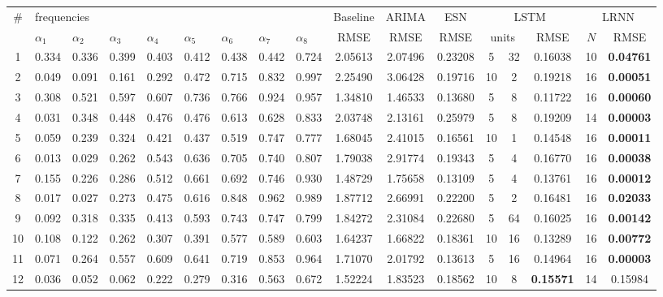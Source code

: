 \documentclass[preprint,12pt,times,authoryear]{elsarticle}%
\theoremstyle{definition}
\begin{document}
	
\begin{table}
  \centering\footnotesize
  \begin{tabular}{c*{8}{p{8mm}}cccc@{\,+\,}cccc}
     \toprule
	\# & \multicolumn{8}{l}{frequencies} & Baseline & ARIMA & ESN & \multicolumn{3}{c}{LSTM} & \multicolumn{2}{c}{LRNN}\\
	& $\alpha_1$ & $\alpha_2$ & $\alpha_3$ & $\alpha_4$ & $\alpha_5$ & $\alpha_6$ & $\alpha_7$ & $\alpha_8$ & RMSE & RMSE & RMSE & \multicolumn{2}{c}{units} & RMSE & $N$ & RMSE\\ \midrule
	1 & 0.334 & 0.336 & 0.399 & 0.403 & 0.412 & 0.438 & 0.442 & 0.724 & 2.05613 & 2.07496 & 0.23208 & 5 & 32 & 0.16038 & 10 & \textbf{0.04761}\\
	2 & 0.049 & 0.091 & 0.161 & 0.292 & 0.472 & 0.715 & 0.832 & 0.997 & 2.25490 & 3.06428 & 0.19716 & 10 & 2 & 0.19218 & 16 & \textbf{0.00051}\\
	3 & 0.308 & 0.521 & 0.597 & 0.607 & 0.736 & 0.766 & 0.924 & 0.957 & 1.34810 & 1.46533 & 0.13680 & 5 & 8 & 0.11722 & 16 & \textbf{0.00060}\\
	4 & 0.031 & 0.348 & 0.448 & 0.476 & 0.476 & 0.613 & 0.628 & 0.833 & 2.03748 & 2.13161 & 0.25979 & 5 & 8 & 0.19209 & 14 & \textbf{0.00003}\\
	5 & 0.059 & 0.239 & 0.324 & 0.421 & 0.437 & 0.519 & 0.747 & 0.777 & 1.68045 & 2.41015 & 0.16561 & 10 & 1 & 0.14548 & 16 & \textbf{0.00011}\\
	6 & 0.013 & 0.029 & 0.262 & 0.543 & 0.636 & 0.705 & 0.740 & 0.807 & 1.79038 & 2.91774 & 0.19343 & 5 & 4 & 0.16770 & 16 & \textbf{0.00038}\\
	7 & 0.155 & 0.226 & 0.286 & 0.512 & 0.661 & 0.692 & 0.746 & 0.930 & 1.48729 & 1.75658 & 0.13109 & 5 & 4 & 0.13761 & 16 & \textbf{0.00012}\\
	8 & 0.017 & 0.027 & 0.273 & 0.475 & 0.616 & 0.848 & 0.962 & 0.989 & 1.87712 & 2.66991 & 0.22200 & 5 & 2 & 0.16481 & 16 & \textbf{0.02033}\\
	9 & 0.092 & 0.318 & 0.335 & 0.413 & 0.593 & 0.743 & 0.747 & 0.799 & 1.84272 & 2.31084 & 0.22680 & 5 & 64 & 0.16025 & 16 & \textbf{0.00142}\\
	10 & 0.108 & 0.122 & 0.262 & 0.307 & 0.391 & 0.577 & 0.589 & 0.603 & 1.64237 & 1.66822 & 0.18361 & 10 & 16 & 0.13289 & 16 & \textbf{0.00772}\\
	11 & 0.071 & 0.264 & 0.557 & 0.609 & 0.641 & 0.719 & 0.853 & 0.964 & 1.71070 & 2.01792 & 0.13613 & 5 & 16 & 0.14964 & 16 & \textbf{0.00003}\\
	12 & 0.036 & 0.052 & 0.062 & 0.222 & 0.279 & 0.316 & 0.563 & 0.672 & 1.52224 & 1.83523 & 0.18562 & 10 & 8 & \textbf{0.15571} & 14 & 0.15984\\

\end{tabular}
\end{table}
\end{document}
